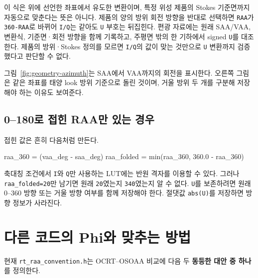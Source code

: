 이 식은 위에 선언한 좌표에서 유도한 변환이며, 특정 위성 제품의 Stokes 기준면까지 자동으로 맞춘다는 뜻은 아니다. 제품의 양의 방위 회전 방향을 반대로 선택하면 \texttt{RAA}가 \texttt{360-RAA}로 바뀌어 \texttt{I/\allowbreak{}Q}는 같아도 \texttt{U} 부호는 뒤집힌다. 편광 자료에는 원래 SAA/VAA, 변환식, 기준면·회전 방향을 함께 기록하고, 주평면 밖의 한 기하에서 signed \texttt{U}를 대조한다. 제품의 방위·Stokes 정의를 모르면 \texttt{I/\allowbreak{}Q}의 값이 맞는 것만으로 \texttt{U} 변환까지 검증했다고 판단할 수 없다.

그림~\ref{fig:geometry-azimuth}는 SAA에서 VAA까지의 회전을 표시한다. 오른쪽 그림은 같은 좌표를 태양 look 방위 기준으로 돌린 것이며, 거울 방위 두 개를 구분해 저장해야 하는 이유도 보여준다.



\subsection{0--180\textdegree{}로 접힌 RAA만 있는 경우}
\label{sec:auto:01_concepts_geometry:4.2}
접힌 값은 흔히 다음처럼 만든다.


\begin{ManualCode}
raa_360 = (vaa_deg - saa_deg) %
raa_folded = min(raa_360, 360.0 - raa_360)
\end{ManualCode}

축대칭 조건에서 \texttt{I}와 \texttt{Q}만 사용하는 LUT에는 반원 격자를 이용할 수 있다. 그러나 \texttt{raa\_\allowbreak{}folded=\allowbreak{}20\textdegree{}}만 남기면 원래 \texttt{20\textdegree{}}였는지 \texttt{340\textdegree{}}였는지 알 수 없다. \texttt{U}를 보존하려면 원래 0--360\textdegree{} 방향 또는 거울 방향 여부를 함께 저장해야 한다. 절댓값 \texttt{abs(U)}를 저장하면 방향 정보가 사라진다.

\section{다른 코드의 Phi와 맞추는 방법}
\label{sec:auto:01_concepts_geometry:5}
현재 \texttt{rt\_\allowbreak{}raa\_\allowbreak{}convention.\allowbreak{}h}는 OCRT--OSOAA 비교에 다음 두 \textbf{동등한 대안 중 하나}를 정의한다.


